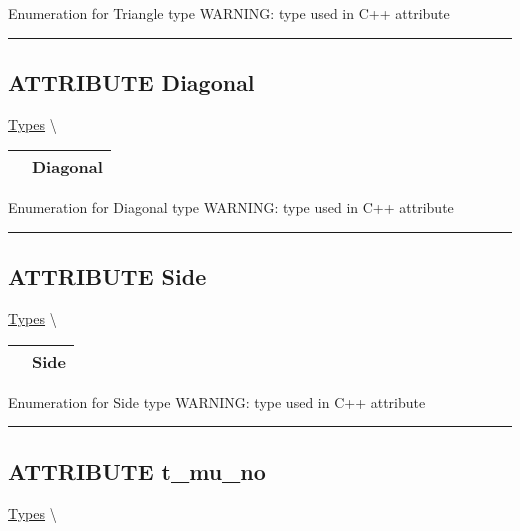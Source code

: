 \par
Enumeration for Triangle type WARNING: type used in C++ attribute


\rule{\linewidth}{0.5pt}
\subsection*{\textsf{\colorbox{headtoc}{\color{white} ATTRIBUTE}
Diagonal}}

\hypertarget{ecldoc:ecldoc-Diagonal}{}
\hspace{0pt} \hyperlink{ecldoc:PBblas.Types}{Types} \textbackslash 

{\renewcommand{\arraystretch}{1.5}
\begin{tabularx}{\textwidth}{|>{\raggedright\arraybackslash}l|X|}
\hline
\hspace{0pt}\mytexttt{\color{red} } & \textbf{Diagonal} \\
\hline
\end{tabularx}
}

\par
Enumeration for Diagonal type WARNING: type used in C++ attribute


\rule{\linewidth}{0.5pt}
\subsection*{\textsf{\colorbox{headtoc}{\color{white} ATTRIBUTE}
Side}}

\hypertarget{ecldoc:ecldoc-Side}{}
\hspace{0pt} \hyperlink{ecldoc:PBblas.Types}{Types} \textbackslash 

{\renewcommand{\arraystretch}{1.5}
\begin{tabularx}{\textwidth}{|>{\raggedright\arraybackslash}l|X|}
\hline
\hspace{0pt}\mytexttt{\color{red} } & \textbf{Side} \\
\hline
\end{tabularx}
}

\par
Enumeration for Side type WARNING: type used in C++ attribute


\rule{\linewidth}{0.5pt}
\subsection*{\textsf{\colorbox{headtoc}{\color{white} ATTRIBUTE}
t\_mu\_no}}

\hypertarget{ecldoc:pbblas.types.t_mu_no}{}
\hspace{0pt} \hyperlink{ecldoc:PBblas.Types}{Types} \textbackslash 

